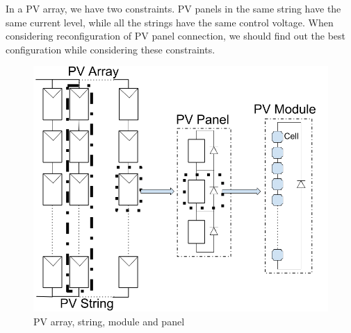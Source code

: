 \documentclass[conference]{pvsctran}
\begin{document}
In a PV array, we have two constraints. 
PV panels in the same string have the same current level, while all the strings have the same control voltage. 
When considering reconfiguration of PV panel connection, we should find out the best configuration while considering these constraints. 

\begin{figure}[t]
    \centering
    \includegraphics[width=0.8\linewidth]{../fig/module.png}
    \caption{PV array, string, module and panel}
    \label{model}
\end{figure}
\end{document}
